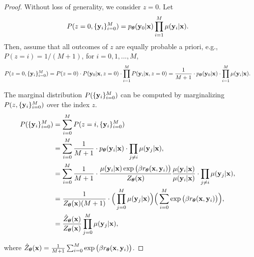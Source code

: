 \begin{proof}
Without loss of generality, we consider $z=0$.
Let 
\begin{equation*}
P(z=0, \{\mathbf{y}_i\}_{i=0}^M) = p_{\boldsymbol\theta}(\mathbf{y}_0 | \mathbf{x}) 
\prod_{i=1}^M \mu(\mathbf{y}_i | \mathbf{x}).
\end{equation*}
Then,
assume that all outcomes of $z$ are equally probable a priori,
e.g.,
$P(z=i) = 1 / (M + 1)$, for $i = 0, 1,...,M$,
\begin{equation*}
P(z=0, \{\mathbf{y}_i\}_{i=0}^M)
=
P(z = 0) 
\cdot
P(\mathbf{y}_0 | \mathbf{x}, z = 0)
\cdot
\prod_{i=1}^M P(\mathbf{y}_i | \mathbf{x}, z = 0)
=
\frac{1}{M + 1}
\cdot
p_{\boldsymbol\theta}(\mathbf{y}_0 | \mathbf{x})
\cdot
\prod_{i=1}^M \mu(\mathbf{y}_i | \mathbf{x}).
\end{equation*}

The marginal distribution $P(\{\mathbf{y}_i\}_{i=0}^M)$ can be computed by marginalizing $P(z, \{\mathbf{y}_i\}_{i=0}^M)$ over the index $z$.
\begin{align*}
P(\{\mathbf{y}_i\}_{i=0}^M)
& =
\sum_{i=0}^M
P(z=i, \{\mathbf{y}_i\}_{i=0}^M)
\\ \nonumber
& =
\sum_{i=0}^M
\frac{1}{M + 1}
\cdot
p_{\boldsymbol\theta}(\mathbf{y}_i | \mathbf{x})
\cdot
\prod_{j \neq i} \mu(\mathbf{y}_j | \mathbf{x}),
\\ \nonumber
& =
\sum_{i=0}^M
\frac{1}{M + 1}
\cdot
\frac{\mu(\mathbf{y}_i | \mathbf{x}) 
\exp
\big(\beta
r_{\boldsymbol\theta}(\mathbf{x}, \mathbf{y}_i)
\big) } {Z_{\boldsymbol\theta}(\mathbf{x})}
\frac{\mu(\mathbf{y}_i | \mathbf{x})} {\mu(\mathbf{y}_i | \mathbf{x})}
\cdot
\prod_{j \neq i} \mu(\mathbf{y}_j | \mathbf{x}),
\\ \nonumber
& =
\frac{1} {Z_{\boldsymbol\theta}(\mathbf{x})(M + 1)}
\cdot
\Big(
\prod_{j=0}^M \mu(\mathbf{y}_j | \mathbf{x})
\Big)
\Big(
\sum_{i=0}^M
\exp\big(
\beta
r_{\boldsymbol\theta}(\mathbf{x}, \mathbf{y}_i)
\big)
\Big),
\\ \nonumber
& =
\frac{\hat{Z}_{\boldsymbol\theta}(\mathbf{x})} {Z_{\boldsymbol\theta}(\mathbf{x})}
\prod_{j=0}^M \mu(\mathbf{y}_j | \mathbf{x}),
\end{align*}

where $\hat{Z}_{\boldsymbol\theta}(\mathbf{x}) = \frac{1} {M + 1} \sum_{i=0}^M \exp
\big(
\beta
r_{\boldsymbol\theta}(\mathbf{x}, \mathbf{y}_i)
\big)
$.
\end{proof}


\UnbiasedMLE*



